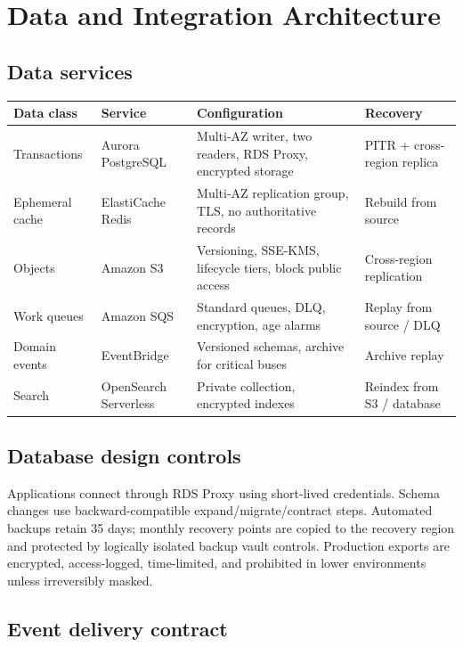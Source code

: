 \section{Data and Integration Architecture}

\subsection{Data services}

\begin{tabularx}{\textwidth}{@{}L{30mm}L{34mm}Y L{28mm}@{}}
  \toprule
  \color{white}\textbf{Data class} & \color{white}\textbf{Service} & \color{white}\textbf{Configuration} & \color{white}\textbf{Recovery} \\
  \midrule
  Transactions & Aurora PostgreSQL & Multi-AZ writer, two readers, RDS Proxy, encrypted storage & PITR + cross-region replica \\
  Ephemeral cache & ElastiCache Redis & Multi-AZ replication group, TLS, no authoritative records & Rebuild from source \\
  Objects & Amazon S3 & Versioning, SSE-KMS, lifecycle tiers, block public access & Cross-region replication \\
  Work queues & Amazon SQS & Standard queues, DLQ, encryption, age alarms & Replay from source / DLQ \\
  Domain events & EventBridge & Versioned schemas, archive for critical buses & Archive replay \\
  Search & OpenSearch Serverless & Private collection, encrypted indexes & Reindex from S3 / database \\
  \bottomrule
\end{tabularx}

\subsection{Database design controls}

Applications connect through RDS Proxy using short-lived credentials. Schema changes use backward-compatible expand/migrate/contract steps. Automated backups retain 35 days; monthly recovery points are copied to the recovery region and protected by logically isolated backup vault controls. Production exports are encrypted, access-logged, time-limited, and prohibited in lower environments unless irreversibly masked.

\subsection{Event delivery contract}

